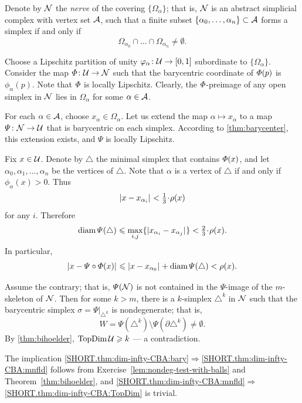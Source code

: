 Denote by $\mathcal{N}$ the \emph{nerve} of the covering $\{\Omega_\alpha\}$;
that is, $\mathcal{N}$ is an abstract simplicial complex with 
vertex set $\mathcal{A}$,
such that a finite subset 
$\{\alpha_0,\z\ldots,\alpha_n\}\subset\IndexSet$
forms a simplex if and only if
\[\Omega_{\alpha_0}
\cap
\ldots\cap
\Omega_{\alpha_n}\ne\emptyset.\]

Choose a Lipschitz partition of unity 
$\varphi_\alpha\colon\mathcal{U}\to [0,1]$ subordinate to $\{\Omega_\alpha\}$.
Consider the map $\varPhi\colon\mathcal{U}\to \mathcal{N}$ such that the barycentric coordinate of $\varPhi(p)$ is $\phi_\alpha(p)$.
Note that $\varPhi$ is locally Lipschitz. 
Clearly, the $\varPhi$-preimage of any open simplex in $\mathcal{N}$ lies in $\Omega_\alpha$ for some $\alpha\in\mathcal{A}$.

For each $\alpha\in\mathcal{A}$, 
choose $x_\alpha\in\Omega_\alpha$.
Let us extend the map $\alpha\mapsto x_\alpha$
to a map $\varPsi\colon\mathcal{N}\to\mathcal{U}$ that is barycentric on each simplex.
According to \ref{thm:barycenter}, this extension exists, 
and $\Psi$ is locally Lipschitz.

Fix $x\in\mathcal{U}$.
Denote by $\triangle$ the minimal simplex that contains $\varPhi(x)$, 
and let $\alpha_0,\alpha_1,\ldots,\alpha_n$ be the vertices of $\triangle$.
Note that $\alpha$ is a vertex of $\triangle$ if and only if $\phi_{\alpha}(x)>0$.
Thus
\[\dist{x}{x_{\alpha_i}}{}<\tfrac{1}{3}\cdot\rho(x)\] 
for any $i$.
Therefore 
\[\diam\Psi(\triangle)
\le
\max_{i,j}\{\dist{x_{\alpha_i}}{x_{\alpha_j}}{}\}
<
\tfrac{2}{3}\cdot\rho(x).\]
In particular, 
\[\dist{x}{\Psi\circ\map(x)}{}\le\dist{x}{x_{\alpha_0}}{}+\diam \Psi(\triangle) <\rho(x).\]

Assume the contrary;
that is, $\varPsi(\mathcal{N})$ is not contained in the $\Psi$-image of the $m$-skeleton of $\mathcal{N}$.
Then for some $k>m$,
there is a $k$-simplex $\triangle^k$ in $\mathcal{N}$
such that the barycentric simplex $\sigma=\Psi|_{\triangle^k}$ is nondegenerate;
that is, 
$$W=\Psi(\triangle^k)\setminus\Psi(\partial\triangle^k)\ne \emptyset.
$$
By \ref{thm:bihoelder}, $\mathop{\rm TopDim}\nolimits\mathcal{U}\geqslant k$ --- a contradiction.
\qeds

The implication \ref{SHORT.thm:dim-infty-CBA:bary}$\Rightarrow$\ref{SHORT.thm:dim-infty-CBA:mnfld} follows from Exercise~\ref{lem:nondeg-test-with-balls}
and Theorem~\ref{thm:bihoelder}, and \ref{SHORT.thm:dim-infty-CBA:mnfld}$\Rightarrow$\ref{SHORT.thm:dim-infty-CBA:TopDim} is trivial.
 
